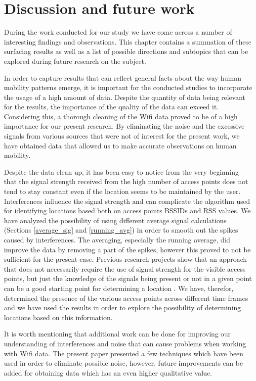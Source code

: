 \chapter{Discussion and future work}

During the work conducted for our study we have come across a number of
interesting findings and observations. This chapter contains a summation of
these surfacing results as well as a list of possible directions and subtopics
that can be explored during future research on the subject.

In order to capture results that can reflect general facts about the way human
mobility patterns emerge, it is important for the conducted studies to
incorporate the usage of a high amount of data. Despite the quantity of data
being relevant for the results, the importance of the quality of the data can
exceed it. Considering this, a thorough cleaning of the Wifi data proved to be
of a high importance for our present research. By eliminating the noise and the
excessive signals from various sources that were not of interest for the present
work, we have obtained data that allowed us to make accurate observations on
human mobility.

Despite the data clean up, it has been easy to notice from the very beginning
that the signal strength received from the high number of access points does not
tend to stay constant even if the location seems to be maintained by the user.
Interferences influence the signal strength \cite{MahantiCWA10} and can
complicate the algorithm used for identifying locations based both on access
points BSSIDs and RSS values. We have analyzed the possibility of using
different average signal calculations (Sections \ref{average_sig} and
\ref{running_avg}) in order to smooth out the spikes caused by interferences.
The averaging, especially the running average, did improve the data by removing
a part of the spikes, however this proved to not be sufficient for the present
case. Previous research projects show that an approach that does not necessarily
require the use of signal strength for the visible access points, but just the
knowledge of the signals being present or not in a given point can be a good
starting point for determining a location
\cite{Larsen:2009:MCT:1813042.1813063}. We have, therefor, determined the
presence of the various access points across different time frames and we have
used the results in order to explore the possibility of determining locations
based on this information.

It is worth mentioning that additional work can be done for improving our
understanding of interferences and noise that can cause problems when working
with Wifi data. The present paper presented a few techniques which have been used in
order to eliminate possible noise, however, future improvements can be added for
obtaining data which has an even higher qualitative value.

